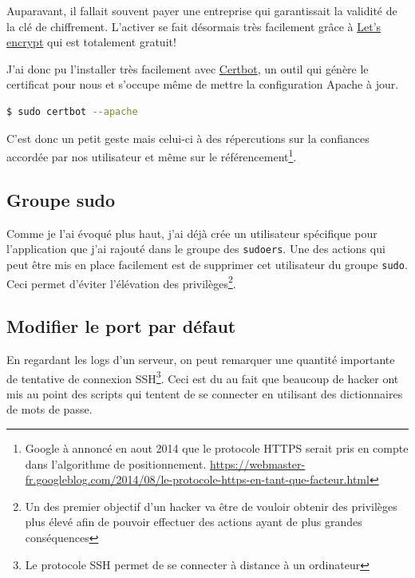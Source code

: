 \documentclass[]{report}
\begin{document}
      Auparavant, il fallait souvent payer une entreprise qui garantissait la validité de la clé de chiffrement. L'activer se fait  désormais très facilement grâce à \href{https://letsencrypt.org/}{Let's encrypt} qui est totalement gratuit!

      J'ai donc pu l'installer très facilement avec \href{https://certbot.eff.org/}{Certbot}, un outil qui génère le certificat pour nous et s’occupe même de mettre la configuration Apache à jour.

      \begin{scriptsize}
        \begin{lstlisting}[language=bash]
        $ sudo certbot --apache
        \end{lstlisting}
      \end{scriptsize}

      C'est donc un petit geste mais celui-ci à des répercutions sur la confiances accordée par nos utilisateur et même sur le référencement\footnote{Google à annoncé en aout 2014 que le protocole HTTPS serait pris en compte dans l'algorithme de positionnement. \url{https://webmaster-fr.googleblog.com/2014/08/le-protocole-https-en-tant-que-facteur.html}}.

    \subsection{Groupe sudo}

      Comme je l'ai évoqué plus haut, j'ai déjà crée un utilisateur spécifique pour l'application que j'ai rajouté dans le groupe des \verb|sudoers|. Une des actions qui peut être mis en place facilement est de supprimer cet utilisateur du groupe \verb|sudo|. Ceci permet d'éviter l’élévation des privilèges\footnote{Un des premier objectif d'un hacker va être de vouloir obtenir des privilèges plus élevé afin de pouvoir effectuer des actions ayant de plus grandes conséquences}.

    \subsection{Modifier le port par défaut}\label{subsec:change_ports}

      En regardant les logs d'un serveur, on peut remarquer une quantité importante de tentative de connexion SSH\footnote{Le protocole SSH permet de se connecter à distance à un ordinateur}. Ceci est du au fait que beaucoup de hacker ont mis au point des scripts qui tentent de se connecter en utilisant des dictionnaires de mots de passe.
\end{document}
